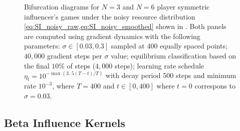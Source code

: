 \documentclass{article}
\begin{document}
\begin{figure}[ht!]
\begin{subfigure}[b]{0.9\linewidth}
                    \end{subfigure}
                    \caption{Bifurcation diagrams for $N = 3$ and $N = 6$ player symmetric influencer's games under the noisy resource distribution \cref{eq:SI_noisy_raw,eq:SI_noisy_smoothed} shown in . Both panels are computed using gradient dynamics with the following parameters: $\sigma \in [0.03, 0.3]$ sampled at 400 equally spaced points; $40{,}000$ gradient steps per $\sigma$ value; equilibrium classification based on the final $10\%$ of steps ($4{,}000$ steps); learning rate schedule $\eta_t = 10^{-\max(3,\,5(T-t)/T)}$ with decay period 500 steps and minimum rate $10^{-3}$, where $T = 400$ and $t\in[0,400]$ where $t=0$ correspons to $\sigma=0.03$.}
                \label{fig:noisy_bifurcation}
                \end{figure}
                \clearpage
                

                \subsection{Beta Influence Kernels}\label{subsec:SI_beta}
\end{document}
